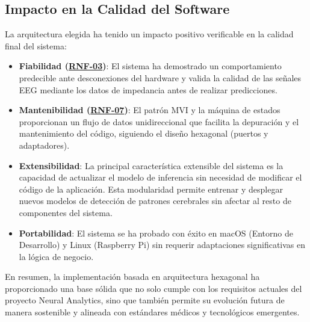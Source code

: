 \subsection{Impacto en la Calidad del Software}

La arquitectura elegida ha tenido un impacto positivo verificable en la calidad final del sistema:

\begin{itemize}
    \item \textbf{Fiabilidad (\hyperref[rnf-03]{RNF-03})}: El sistema ha demostrado un comportamiento predecible ante desconexiones del hardware y valida la calidad de las señales EEG mediante los datos de impedancia antes de realizar predicciones.
    
    \item \textbf{Mantenibilidad (\hyperref[rnf-07]{RNF-07})}: El patrón MVI y la máquina de estados proporcionan un flujo de datos unidireccional que facilita la depuración y el mantenimiento del código, siguiendo el diseño hexagonal (puertos y adaptadores).
    
    \item \textbf{Extensibilidad}: La principal característica extensible del sistema es la capacidad de actualizar el modelo de inferencia sin necesidad de modificar el código de la aplicación. Esta modularidad permite entrenar y desplegar nuevos modelos de detección de patrones cerebrales sin afectar al resto de componentes del sistema.
    
    \item \textbf{Portabilidad}: El sistema se ha probado con éxito en macOS (Entorno de Desarrollo) y Linux (Raspberry Pi) sin requerir adaptaciones significativas en la lógica de negocio.
\end{itemize}

En resumen, la implementación basada en arquitectura hexagonal ha proporcionado una base sólida que no solo cumple con los requisitos actuales del proyecto Neural Analytics, sino que también permite su evolución futura de manera sostenible y alineada con estándares médicos y tecnológicos emergentes.
